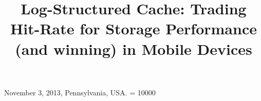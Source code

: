 \documentclass{sig-alternate}
\begin{document}
%
 {November 3, 2013, Pennsylvania, USA.} 
\widowpenalty = 10000

\title{\Large \bf Log-Structured Cache: Trading Hit-Rate for Storage Performance
  (and winning) in Mobile Devices}
%
%
%
%
%
\end{document}
